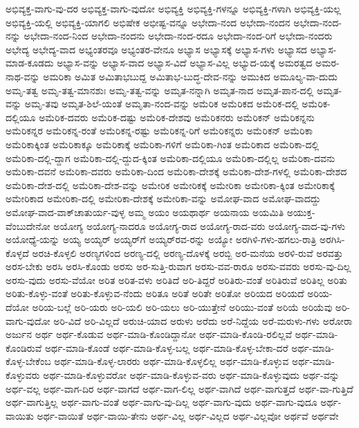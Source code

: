 {ಅಭಿವ್ಯಕ್ತ-ವಾಗು-ವು-ದರ
ಅಭಿವ್ಯಕ್ತ-ವಾಗು-ವುದೋ
ಅಭಿವ್ಯಕ್ತಿ
ಅಭಿವ್ಯಕ್ತಿ-ಗಳನ್ನೂ
ಅಭಿವ್ಯಕ್ತಿ-ಗಳಾಗಿ
ಅಭಿವ್ಯಕ್ತಿ-ಯಲ್ಲ
ಅಭಿವ್ಯಕ್ತಿ-ಯಲ್ಲಿ
ಅಭಿವ್ಯಕ್ತಿ-ಯಾಗಲಿ
ಅಭಿಷೇಕ
ಅಭೀಷ್ಟ-ವನ್ನೂ
ಅಭೇದಾ-ನಂದ
ಅಭೇದಾ-ನಂದನ
ಅಭೇದಾ-ನಂದ-ನನ್ನು
ಅಭೇದಾ-ನಂದ-ನಿಂದ
ಅಭೇದಾ-ನಂದನು
ಅಭೇದಾ-ನಂದ-ರದೂ
ಅಭೇದಾ-ನಂದ-ರಿಗೆ
ಅಭೇದಾ-ನಂದರು
ಅಭೇದ್ಯ
ಅಭೇದ್ಯ-ವಾದ
ಅಭ್ಯಂತರವೂ
ಅಭ್ಯಂತರ-ವೇನೂ
ಅಭ್ಯಾಸ
ಅಭ್ಯಾಸಕ್ಕೆ
ಅಭ್ಯಾಸ-ಗಳು
ಅಭ್ಯಾಸದ
ಅಭ್ಯಾಸ-ಮಾಡ-ಕೂಡದು
ಅಭ್ಯಾಸ-ವನ್ನು
ಅಭ್ಯಾಸ-ವಾದ
ಅಭ್ಯಾಸ-ವಿದೆ
ಅಭ್ಯಾಸ-ವಿಲ್ಲ
ಅಭ್ಯುದ-ಯಕ್ಕೆ
ಅಮರತ್ವದ
ಅಮರ-ನಾಥ-ವನ್ನು
ಅಮರಿಕಾ
ಅಮಿತ
ಅಮಿತಾಭಬುದ್ದ
ಅಮಿತಾಭ-ಬುದ್ಧ-ದೇವ-ನನ್ನು
ಅಮುಕಿದ
ಅಮೂಲ್ಯ-ವಾ-ದುದು
ಅಮೃ-ತತ್ವ
ಅಮೃ-ತತ್ವ-ಮಾನಶುಃ
ಅಮೃ-ತತ್ವ-ವನ್ನು
ಅಮೃತ-ನನ್ನಾಗಿ
ಅಮೃತ-ನಾದ
ಅಮೃತ-ಪಾನ-ದಲ್ಲಿ
ಅಮೃತ-ವನ್ನು
ಅಮೃ-ತವು
ಅಮೃತ-ಶಿಲೆ-ಯಂತೆ
ಅಮೃತಾ-ನಂದ-ವನ್ನು
ಅಮೆರಿಕ
ಅಮೆರಿಕದ
ಅಮೆರಿಕ-ದಲ್ಲಿ
ಅಮೆರಿಕ-ದಲ್ಲಿಯೂ
ಅಮೆರಿಕ-ದವರು
ಅಮೆರಿಕ-ದಷ್ಟು
ಅಮೆರಿಕ-ದೇಶವು
ಅಮೆರಿಕನರು
ಅಮೆರಿಕನ್
ಅಮೆರಿಕನ್ನನು
ಅಮೆರಿಕನ್ನರ
ಅಮೆರಿಕನ್ನ-ರಂತೆ
ಅಮೆರಿಕನ್ನ-ರಷ್ಟು
ಅಮೆರಿಕನ್ನ-ರಿಗೆ
ಅಮೆರಿಕನ್ನರು
ಅಮೆರಿಕನ್‌
ಅಮೆರಿಕಾ
ಅಮೆರಿಕಾಕ್ಕಿಂತ
ಅಮೆರಿಕಾಕ್ಕೂ
ಅಮೆರಿಕಾಕ್ಕೆ
ಅಮೆರಿಕಾ-ಗಳಿಗೆ
ಅಮೆರಿಕಾ-ಗಿಂತ
ಅಮೆರಿಕಾದ
ಅಮೆರಿಕಾ-ದಲ್ಲಿ
ಅಮೆರಿಕಾ-ದಲ್ಲಿ-ದ್ದಾಗ
ಅಮೆರಿಕಾ-ದಲ್ಲಿ-ದ್ದುದ-ಕ್ಕಿಂತ
ಅಮೆರಿಕಾ-ದಲ್ಲಿಯೂ
ಅಮೆರಿಕಾ-ದಲ್ಲಿಲ್ಲ
ಅಮೆರಿಕಾ-ದವನು
ಅಮೆರಿಕಾ-ದವನೆ
ಅಮೆರಿಕಾ-ದವರು
ಅಮೆರಿಕಾ-ದಿಂದ
ಅಮೆರಿಕಾ-ದೇಶಕ್ಕೆ
ಅಮೆರಿಕಾ-ದೇಶ-ಗಳಲ್ಲಿ
ಅಮೆರಿಕಾ-ದೇಶದ
ಅಮೆರಿಕಾ-ದೇಶ-ದಲ್ಲಿ
ಅಮೆರಿಕಾ-ದೇಶ-ವನ್ನು
ಅಮೇರಿಕ
ಅಮೇರಿಕಕ್ಕೆ
ಅಮೇರಿಕಾ
ಅಮೇರಿಕಾ-ಕ್ಕಿಂತ
ಅಮೇರಿಕಾಕ್ಕೆ
ಅಮೇರಿಕಾದ
ಅಮೇರಿಕಾ-ದಲ್ಲಿ
ಅಮೇರಿಕಾ-ದೇಶಕ್ಕೆ
ಅಮೇರಿಕಾ-ವನ್ನು
ಅಮೋಘ-ವಾದ
ಅಮೋಘ-ವಾದದ್ದು
ಅಮೋಘ-ವಾದ-ವಾಕ್‌ಚಾತುರ್ಯ-ವುಳ್ಳ
ಅಮ್ಮ
ಅಯಂ
ಅಯಥಾರ್ಥ
ಅಯನಾಯ
ಅಯಮಿತಿ
ಅಯುಕ್ತ-ವೆಂಬುದೇನೋ
ಅಯೋಗ್ಯ
ಅಯೋಗ್ಯ-ನಾದರೂ
ಅಯೋಗ್ಯ-ರಾದ
ಅಯೋಗ್ಯ-ರಾದ-ವರು
ಅಯೋಗ್ಯ-ವಾದ-ವು-ಗಳು
ಅಯೋಧ್ಯೆ-ಯನ್ನು
ಅಯ್ಯ
ಅಯ್ಯರ್
ಅಯ್ಯರ್‌ಗೆ
ಅಯ್ಯರ್‌ರವ-ರನ್ನು
ಅಯ್ಯೋ
ಅರಗಿಳಿ-ಗಳು-ಹಗಲು-ರಾತ್ರಿ
ಅರಗಿಸಿ-ಕೊಳ್ಳದೆ
ಅರಚಿ-ಕೊಳ್ಳಲಿ
ಅರಣ್ಯಗಳಿಂದ
ಅರಣ್ಯ-ದಲ್ಲಿ
ಅರಣ್ಯ-ದೊಳಕ್ಕೆ
ಅರಬ್ಬಿ
ಅರ-ಮನೆಯ
ಅರಳಿ-ರುವೆ
ಅರವತ್ತು
ಅರಸ-ಬೇಕು
ಅರಸಿ
ಅರಸಿ-ಕೊಂಡು
ಅರಸು
ಅರ-ಸುತ್ತಿ-ರುವಾಗ
ಅರಸು-ವವ-ರಾರೂ
ಅರಸು-ವವರು
ಅರಸು-ವು-ದಿಲ್ಲ
ಅರಸು-ವುದು
ಅರಸು-ವೆಯೋ
ಅರಿತ
ಅರಿತ-ವಳು
ಅರಿತಿದೆ
ಅರಿ-ತಿದ್ದರೆ
ಅರಿತಿರು-ವಂತೆ
ಅರಿತಿರುವೆ
ಅರಿತಿಲ್ಲ
ಅರಿತು
ಅರಿತು-ಕೊಳ್ಳು-ವಂತೆ
ಅರಿತು-ಕೊಳ್ಳುವ-ನೆಂದು
ಅರಿತೂ
ಅರಿತೆ
ಅರಿತೇ
ಅರಿತೋ
ಅರಿಯದ
ಅರಿಯದೆ
ಅರಿಯ-ದೆಯೋ
ಅರಿಯ-ಬಲ್ಲೆ
ಅರಿ-ಯರು
ಅರಿ-ಯಲಿ
ಅರಿ-ಯಲು
ಅರಿ-ಯುತ್ತೇನೆ
ಅರಿಯು-ವಂತೆ
ಅರಿಯೆ
ಅರಿಯೆವು
ಅರಿ-ವಾಗು-ವುದೋ
ಅರಿ-ವಿದೆ
ಅರಿ-ವಿಲ್ಲದೆ
ಅರುಚಿ-ಯಾದ
ಅರುಳು
ಅರೆದು
ಅರೆ-ನಿದ್ದೆಯ
ಅರೆ-ಮರುಳು-ಗಳು
ಅರೋರಾ
ಅರ್ಜುನ
ಅರ್ಥ
ಅರ್ಥ-ಕೊಡುವ
ಅರ್ಥ-ಮಾಡಿ-ಕೊಂಡಿದ್ದಾನೋ
ಅರ್ಥ-ಮಾಡಿ-ಕೊಂಡಿ-ರಲಿಲ್ಲವೆ
ಅರ್ಥ-ಮಾಡಿ-ಕೊಂಡಿರುವೆ
ಅರ್ಥ-ಮಾಡಿ-ಕೊಂಡೆ
ಅರ್ಥ-ಮಾಡಿ-ಕೊಳ್ಳ-ಬಲ್ಲ
ಅರ್ಥ-ಮಾಡಿ-ಕೊಳ್ಳ-ಬೇಕಾ-ದರೆ
ಅರ್ಥ-ಮಾಡಿ-ಕೊಳ್ಳ-ಬೇಕೆಂಬ
ಅರ್ಥ-ಮಾಡಿ-ಕೊಳ್ಳ-ಲಾರರು
ಅರ್ಥ-ಮಾಡಿ-ಕೊಳ್ಳಲಿಲ್ಲ
ಅರ್ಥ-ಮಾಡಿ-ಕೊಳ್ಳುವ
ಅರ್ಥ-ಮಾಡಿ-ಕೊಳ್ಳುವರು
ಅರ್ಥ-ಮಾಡಿ-ಕೊಳ್ಳುವರೋ
ಅರ್ಥ-ಮಾಡಿ-ಕೊಳ್ಳುವ-ವರು
ಅರ್ಥ-ಮಾಡಿ-ಕೊಳ್ಳುವುದು
ಅರ್ಥ-ವನ್ನು
ಅರ್ಥ-ವಲ್ಲ
ಅರ್ಥ-ವಾಗ-ದಿರ
ಅರ್ಥ-ವಾಗದೆ
ಅರ್ಥ-ವಾಗ-ಲಿಲ್ಲ
ಅರ್ಥ-ವಾಗಿದೆ
ಅರ್ಥ-ವಾಗುತ್ತದೆ
ಅರ್ಥ-ವಾ-ಗುತ್ತಿದೆ
ಅರ್ಥ-ವಾಗುತ್ತಿಲ್ಲ
ಅರ್ಥ-ವಾಗು-ವಂತೆ
ಅರ್ಥ-ವಾಗು-ವು-ದಿಲ್ಲ
ಅರ್ಥ-ವಾಗು-ವುದು
ಅರ್ಥ-ವಾಗು-ವುದೂ
ಅರ್ಥ-ವಾಯಿತು
ಅರ್ಥ-ವಾಯಿತೆ
ಅರ್ಥ-ವಾಯಿ-ತೇನು
ಅರ್ಥ-ವಿಲ್ಲ
ಅರ್ಥ-ವಿಲ್ಲದ
ಅರ್ಥ-ವಿಲ್ಲವೋ
ಅರ್ಥವೆ
ಅರ್ಥವೇ
}
